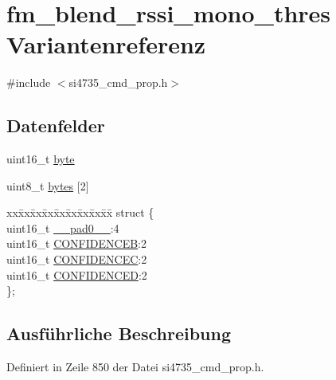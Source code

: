 \hypertarget{unionfm__blend__rssi__mono__thres}{}\section{fm\+\_\+blend\+\_\+rssi\+\_\+mono\+\_\+thres Variantenreferenz}
\label{unionfm__blend__rssi__mono__thres}


{\ttfamily \#include $<$si4735\+\_\+cmd\+\_\+prop.\+h$>$}

\subsection*{Datenfelder}
\begin{DoxyCompactItemize}
\item 
uint16\+\_\+t \hyperlink{unionfm__blend__rssi__mono__thres_ab0549c1b5ea980a02e7eab77e21fea49}{byte}
\item 
uint8\+\_\+t \hyperlink{unionfm__blend__rssi__mono__thres_a46e4c05d20a047ec169f60d3167e912e}{bytes} \mbox{[}2\mbox{]}
\item 
\begin{tabbing}
xx\=xx\=xx\=xx\=xx\=xx\=xx\=xx\=xx\=\kill
struct \{\\
\>uint16\_t \hyperlink{unionfm__blend__rssi__mono__thres_a77132c2c26a75f5b8751b235cda23828}{\_\_pad0\_\_}:4\\
\>uint16\_t \hyperlink{unionfm__blend__rssi__mono__thres_ad50cf40b7308de47174d7172846def72}{CONFIDENCEB}:2\\
\>uint16\_t \hyperlink{unionfm__blend__rssi__mono__thres_ab0a4bcb0b2e578ddbbbc4e33767a7df2}{CONFIDENCEC}:2\\
\>uint16\_t \hyperlink{unionfm__blend__rssi__mono__thres_af81bc38f41af0228eb6a646489ad2e3a}{CONFIDENCED}:2\\
\}; \\

\end{tabbing}\end{DoxyCompactItemize}


\subsection{Ausführliche Beschreibung}


Definiert in Zeile 850 der Datei si4735\+\_\+cmd\+\_\+prop.\+h.



